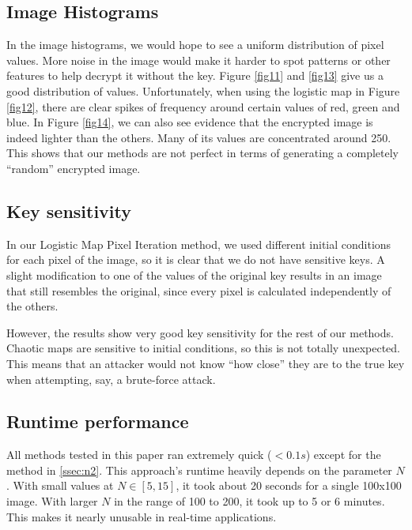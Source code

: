 \documentclass[10pt]{article}
\begin{document}
    \subsection{Image Histograms}
    
    In the image histograms, we would hope to see a uniform distribution of pixel values. More noise in the image would make it harder to spot patterns or other features to help decrypt it without the key. Figure \ref{fig11} and \ref{fig13} give us a good distribution of values. Unfortunately, when using the logistic map in Figure \ref{fig12}, there are clear spikes of frequency around certain values of red, green and blue. In Figure \ref{fig14}, we can also see evidence that the encrypted image is indeed lighter than the others. Many of its values are concentrated around 250. This shows that our methods are not perfect in terms of generating a completely ``random'' encrypted image.\\
    
    
    \subsection{Key sensitivity}
    
    In our Logistic Map Pixel Iteration method, we used different initial conditions for each pixel of the image, so it is clear that we do not have sensitive keys. A slight modification to one of the values of the original key results in an image that still resembles the original, since every pixel is calculated independently of the others.
    
    However, the results show very good key sensitivity for the rest of our methods. Chaotic maps are sensitive to initial conditions, so this is not totally unexpected. This means that an attacker would not know ``how close'' they are to the true key when attempting, say, a brute-force attack.
    
    \subsection{Runtime performance}
    
    All methods tested in this paper ran extremely quick ($< 0.1s$) except for the method in \ref{ssec:n2}. This approach's runtime heavily depends on the parameter $N$. With small values at $N \in [5, 15]$, it took about 20 seconds for a single 100x100 image. With larger $N$ in the range of 100 to 200, it took up to 5 or 6 minutes. This makes it nearly unusable in real-time applications.\\
    
\end{document}
